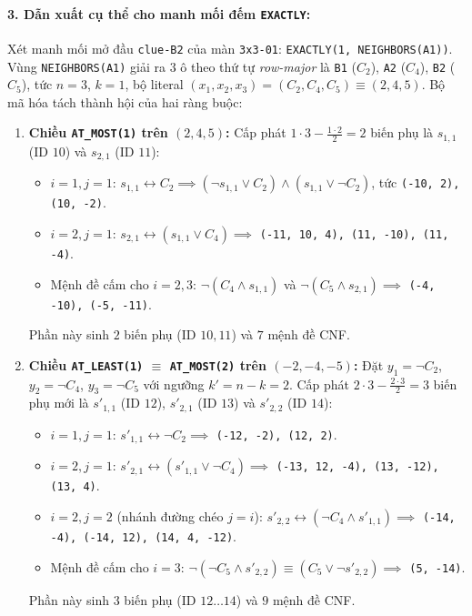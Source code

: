 \documentclass[12pt,a4paper]{article}
\begin{document}
\paragraph{3. Dẫn xuất cụ thể cho manh mối đếm \texttt{EXACTLY}:}
Xét manh mối mở đầu \texttt{clue-B2} của màn \texttt{3x3-01}: \texttt{EXACTLY(1, NEIGHBORS(A1))}. Vùng \texttt{NEIGHBORS(A1)} giải ra $3$ ô theo thứ tự \emph{row-major} là \texttt{B1} ($C_2$), \texttt{A2} ($C_4$), \texttt{B2} ($C_5$), tức $n = 3$, $k = 1$, bộ literal $(x_1, x_2, x_3) = (C_2, C_4, C_5) \equiv (2, 4, 5)$. Bộ mã hóa tách thành hội của hai ràng buộc:
\begin{enumerate}
    \item \textbf{Chiều \texttt{AT\_MOST(1)} trên $(2, 4, 5)$:} Cấp phát $1 \cdot 3 - \frac{1 \cdot 2}{2} = 2$ biến phụ là $s_{1,1}$ (ID $10$) và $s_{2,1}$ (ID $11$):
    \begin{itemize}
        \item $i=1, j=1$: $s_{1,1} \leftrightarrow C_2 \implies (\neg s_{1,1} \lor C_2) \land (s_{1,1} \lor \neg C_2)$, tức \texttt{(-10, 2), (10, -2)}.
        \item $i=2, j=1$: $s_{2,1} \leftrightarrow (s_{1,1} \lor C_4) \implies$ \texttt{(-11, 10, 4), (11, -10), (11, -4)}.
        \item Mệnh đề cấm cho $i=2, 3$: $\neg(C_4 \land s_{1,1})$ và $\neg(C_5 \land s_{2,1}) \implies$ \texttt{(-4, -10), (-5, -11)}.
    \end{itemize}
    Phần này sinh $2$ biến phụ (ID $10, 11$) và $7$ mệnh đề CNF.

    \item \textbf{Chiều \texttt{AT\_LEAST(1)} $\equiv$ \texttt{AT\_MOST(2)} trên $(-2, -4, -5)$:} Đặt $y_1 = \neg C_2$, $y_2 = \neg C_4$, $y_3 = \neg C_5$ với ngưỡng $k' = n - k = 2$. Cấp phát $2 \cdot 3 - \frac{2 \cdot 3}{2} = 3$ biến phụ mới là $s'_{1,1}$ (ID $12$), $s'_{2,1}$ (ID $13$) và $s'_{2,2}$ (ID $14$):
    \begin{itemize}
        \item $i=1, j=1$: $s'_{1,1} \leftrightarrow \neg C_2 \implies$ \texttt{(-12, -2), (12, 2)}.
        \item $i=2, j=1$: $s'_{2,1} \leftrightarrow (s'_{1,1} \lor \neg C_4) \implies$ \texttt{(-13, 12, -4), (13, -12), (13, 4)}.
        \item $i=2, j=2$ (nhánh đường chéo $j = i$): $s'_{2,2} \leftrightarrow (\neg C_4 \land s'_{1,1}) \implies$ \texttt{(-14, -4), (-14, 12), (14, 4, -12)}.
        \item Mệnh đề cấm cho $i=3$: $\neg(\neg C_5 \land s'_{2,2}) \equiv (C_5 \lor \neg s'_{2,2}) \implies$ \texttt{(5, -14)}.
    \end{itemize}
    Phần này sinh $3$ biến phụ (ID $12 \dots 14$) và $9$ mệnh đề CNF.
\end{enumerate}
\end{document}
